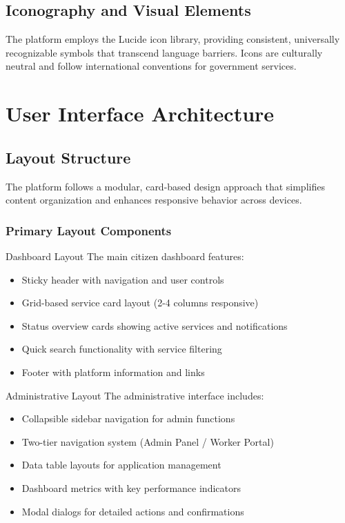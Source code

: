 \documentclass[12pt,a4paper]{article}
\begin{document}
\subsection{Iconography and Visual Elements}

The platform employs the Lucide icon library, providing consistent, universally recognizable symbols that transcend language barriers. Icons are culturally neutral and follow international conventions for government services.

\section{User Interface Architecture}

\subsection{Layout Structure}

The platform follows a modular, card-based design approach that simplifies content organization and enhances responsive behavior across devices.

\subsubsection{Primary Layout Components}

\begin{featurebox}{Dashboard Layout}
The main citizen dashboard features:
\begin{itemize}
    \item Sticky header with navigation and user controls
    \item Grid-based service card layout (2-4 columns responsive)
    \item Status overview cards showing active services and notifications
    \item Quick search functionality with service filtering
    \item Footer with platform information and links
\end{itemize}
\end{featurebox}

\begin{featurebox}{Administrative Layout}
The administrative interface includes:
\begin{itemize}
    \item Collapsible sidebar navigation for admin functions
    \item Two-tier navigation system (Admin Panel / Worker Portal)
    \item Data table layouts for application management
    \item Dashboard metrics with key performance indicators
    \item Modal dialogs for detailed actions and confirmations
\end{itemize}
\end{featurebox}
\end{document}
